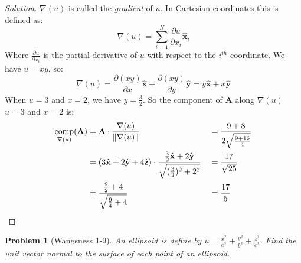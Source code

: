 \documentclass[oneside]{book}
\theoremstyle{mystyle}
\newtheorem{problem}{Problem}[section]
\DeclareMathOperator{\comp}{comp}
\DeclarePairedDelimiter\norm{\lVert}{\rVert}
\begin{document}
\begin{proof}[Solution]
$\nabla(u)$ is called the \textit{gradient} of $u$. In Cartesian coordinates this is defined as:
\begin{equation*}
    \nabla(u)=\sum_{i=1}^{N}\frac{\partial u}{\partial x_{i}}\hat{\mathbf{x}}_{i}
\end{equation*}
Where $\frac{\partial u}{\partial x_{i}}$ is the partial derivative of $u$ with respect to the $i^{th}$ coordinate. We have $u=xy$, so:
\begin{equation*}
    \nabla(u)=\frac{\partial(xy)}{\partial x}\hat{\mathbf{x}}+\frac{\partial(xy)}{\partial y}\hat{\mathbf{y}}=y\hat{\mathbf{x}}+x\hat{\mathbf{y}}
\end{equation*}
When $u=3$ and $x=2$, we have $y=\frac{3}{2}$. So the component of $\mathbf{A}$ along $\nabla(u)$ $u=3$ and $x=2$ is:
\begin{align*}
    \comp_{\nabla(u)}(\mathbf{A})&=\mathbf{A}\cdot\frac{\nabla(u)}{\norm{\nabla(u)}}& &=\frac{9+8}{2\sqrt{\frac{9+16}{4}}}\\
    &=(3\hat{\mathbf{x}}+2\hat{\mathbf{y}}+4\hat{\mathbf{z}})\cdot\frac{\frac{3}{2}\hat{\mathbf{x}}+2\hat{\mathbf{y}}}{\sqrt{(\frac{3}{2})^2+2^2}}& &=\frac{17}{\sqrt{25}}\\
    &=\frac{\frac{9}{2}+4}{\sqrt{\frac{9}{4}+4}}& &=\frac{17}{5}\\
\end{align*}
\end{proof}
\begin{problem}[Wangsness 1-9]
An ellipsoid is define by $u = \frac{x^2}{a^2}+\frac{y^2}{b^2}+\frac{z^2}{c^2}$. Find the unit vector normal to the surface of each point of an ellipsoid.
\end{problem}
\end{document}
